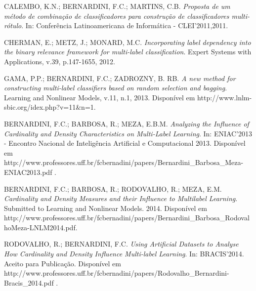 \begin{thebibliography}{10}
        {CALEMBO, K.N.; BERNARDINI, F.C.; MARTINS, C.B.
        \textit{Proposta de um método de combinação de classificadores para construção de classificadores multi-rótulo}. 
        In: Conferência Latinoamericana de Informática - CLEI'2011,2011.}

        {CHERMAN, E.; METZ, J.; MONARD, M.C.
        \textit{Incorporating label dependency into the binary relevance framework for multi-label classification}. 
        Expert Systems with Applications, v.39, p.147-1655, 2012.}
        
        {GAMA, P.P.; BERNARDINI, F.C.; ZADROZNY, B. RB.
        \textit{A new method for constructing multi-label classifiers based on random selection and bagging}.
        Learning and Nonlinear Models, v.11, n.1, 2013. Disponível em http://www.lnlm-sbic.org/idex.php?v=11\&n=1.}
	
        {BERNARDINI, F.C.; BARBOSA, R.; MEZA, E.B.M.
        \textit{Analyzing the Influence of Cardinality and Density Characteristics on Multi-Label Learning}. 
        In: ENIAC'2013 - Encontro Nacional de Inteligência Artificial e Computacional 2013. Disponível em http://www.professores.uff.br/fcbernadini/papers/Bernardini\_Barbosa\_Meza-ENIAC2013.pdf .}

        {BERNARDINI, F.C.; BARBOSA, R.; RODOVALHO, R.; MEZA, E.M.
        \textit{Cardinality and Density Measures and their Influence to Multilabel Learning}. 
        Submitted to Learning and Nonlinear Models. 2014. Disponível em http://www.professores.uff.br/fcbernadini/papers/Bernardini\_Barbosa\_RodovalhoMeza-LNLM2014.pdf.}

        {RODOVALHO, R.; BERNARDINI, F.C.
        \textit{Using Artificial Datasets to Analyse How Cardinality and Density Influence Multi-label Learning}. 
        In: BRACIS'2014. Aceito para Publicação.  Disponível em http://www.professores.uff.br/fcbernadini/papers/Rodovalho\_Bernardini-Bracis\_2014.pdf .}

\end{thebibliography}
